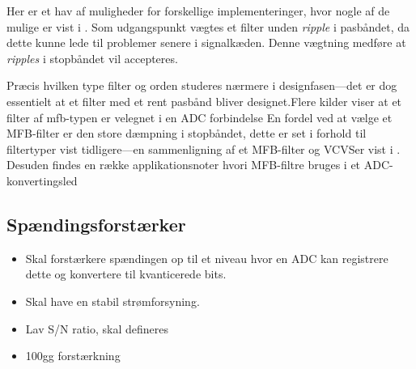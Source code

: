 Her er et hav af muligheder for forskellige implementeringer, hvor nogle af de mulige er vist i . Som udgangspunkt vægtes et filter unden \emph{ripple} i pasbåndet, da dette kunne lede til problemer senere i signalkæden. Denne vægtning medføre at \emph{ripples} i stopbåndet vil accepteres.\tbr
{}


Præcis hvilken type filter og orden studeres nærmere i designfasen---det er dog essentielt at et filter med et rent pasbånd bliver designet.Flere kilder viser at et filter af \acrlong{mfb}-typen er velegnet i en ADC forbindelse \cite[s.~413]{Horowitz2015}
En fordel ved at vælge et MFB-filter er den store dæmpning i stopbåndet, dette er set i forhold til filtertyper\cite{ADCMFBTI} vist tidligere---en sammenligning af et MFB-filter og VCVS\tbr er vist i . Desuden findes en række applikationsnoter hvori MFB-filtre bruges i et ADC-konvertingsled\cite{OPA344Data}\tbr

\subsection{Spændingsforstærker}
\begin{itemize}
    \item Skal forstærkere spændingen op til et niveau hvor en ADC kan registrere dette og konvertere til kvanticerede bits.
    \item Skal have en stabil strømforsyning.
    \item Lav S/N ratio, \tbr skal defineres
    \item 100gg forstærkning \tbr
\end{itemize}

